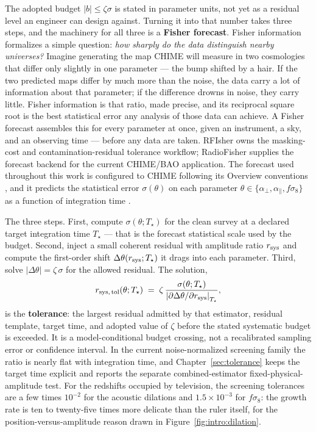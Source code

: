 The adopted budget $|b| \le \zeta\sigma$ is stated in parameter units, not yet as a residual level an engineer can design against. Turning it into that number takes three steps, and the machinery for all three is a \textbf{Fisher forecast}. Fisher information formalizes a simple question: \emph{how sharply do the data distinguish nearby universes?} Imagine generating the map CHIME will measure in two cosmologies that differ only slightly in one parameter --- the bump shifted by a hair. If the two predicted maps differ by much more than the noise, the data carry a lot of information about that parameter; if the difference drowns in noise, they carry little. Fisher information is that ratio, made precise, and its reciprocal square root is the best statistical error any analysis of those data can achieve. A Fisher forecast assembles this for every parameter at once, given an instrument, a sky, and an observing time --- before any data are taken. RFIsher owns the masking-cost and contamination-residual tolerance workflow; RadioFisher supplies the forecast backend for the current CHIME/BAO application. The forecast used throughout this work is configured to CHIME following its Overview conventions \cite{amiri2022chime}, and it predicts the statistical error $\sigma(\theta)$ on each parameter $\theta \in \{\alpha_\perp, \alpha_\parallel, f\sigma_8\}$ as a function of integration time \cite{bull2015}.

The three steps. First, compute $\sigma(\theta;T_\star)$ for the clean survey at a declared target integration time $T_\star$ --- that is the forecast statistical scale used by the budget. Second, inject a small coherent residual with amplitude ratio $r_{\rm sys}$ and compute the first-order shift $\Delta\theta(r_{\rm sys};T_\star)$ it drags into each parameter. Third, solve $|\Delta\theta| = \zeta\,\sigma$ for the allowed residual. The solution,
\[
r_{{\rm sys},\,\rm tol}(\theta;T_\star)
\;=\;
\zeta\,
\frac{\sigma(\theta;T_\star)}
     {\left|\partial\Delta\theta/\partial r_{\rm sys}\right|_{T_\star}},
\]
is the \textbf{tolerance}: the largest residual admitted by that estimator, residual template, target time, and adopted value of $\zeta$ before the stated systematic budget is exceeded. It is a model-conditional budget crossing, not a recalibrated sampling error or confidence interval. In the current noise-normalized screening family the ratio is nearly flat with integration time, and Chapter~\ref{sec:tolerance} keeps the target time explicit and reports the separate combined-estimator fixed-physical-amplitude test. For the redshifts occupied by television, the screening tolerances are a few times $10^{-2}$ for the acoustic dilations and $1.5\times10^{-3}$ for $f\sigma_8$: the growth rate is ten to twenty-five times more delicate than the ruler itself, for the position-versus-amplitude reason drawn in Figure~\ref{fig:intro:dilation}.

